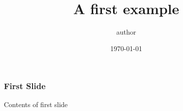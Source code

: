 \documentclass{beamer} \title {A first example} \author{author} \date{\today}
\begin{document}
\frame{\titlepage} \begin{frame} \frametitle{First Slide}
Contents of first slide \end{frame}
\end{document}
